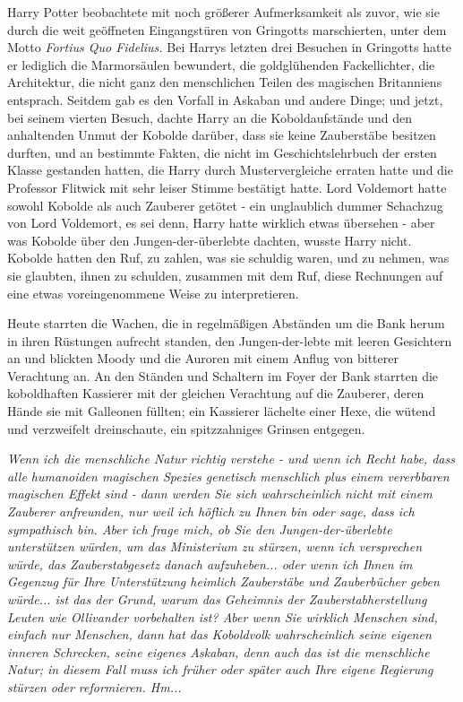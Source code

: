 Harry Potter beobachtete mit noch größerer Aufmerksamkeit als zuvor, wie sie
durch die weit geöffneten Eingangstüren von Gringotts marschierten, unter dem
Motto \emph{Fortius Quo Fidelius.} Bei Harrys letzten drei Besuchen in Gringotts
hatte er lediglich die Marmorsäulen bewundert, die goldglühenden Fackellichter,
die Architektur, die nicht ganz den menschlichen Teilen des magischen
Britanniens entsprach. Seitdem gab es den Vorfall in Askaban und andere Dinge;
und jetzt, bei seinem vierten Besuch, dachte Harry an die Koboldaufstände und
den anhaltenden Unmut der Kobolde darüber, dass sie keine Zauberstäbe besitzen
durften, und an bestimmte Fakten, die nicht im Geschichtslehrbuch der ersten
Klasse gestanden hatten, die Harry durch Mustervergleiche erraten hatte und die
Professor Flitwick mit sehr leiser Stimme bestätigt hatte. Lord Voldemort hatte
sowohl Kobolde als auch Zauberer getötet - ein unglaublich dummer Schachzug von
Lord Voldemort, es sei denn, Harry hatte wirklich etwas übersehen - aber was
Kobolde über den Jungen-der-überlebte dachten, wusste Harry nicht. Kobolde
hatten den Ruf, zu zahlen, was sie schuldig waren, und zu nehmen, was sie
glaubten, ihnen zu schulden, zusammen mit dem Ruf, diese Rechnungen auf eine
etwas voreingenommene Weise zu interpretieren.

Heute starrten die Wachen, die in regelmäßigen Abständen um die Bank herum in
ihren Rüstungen aufrecht standen, den Jungen-der-lebte mit leeren Gesichtern an
und blickten Moody und die Auroren mit einem Anflug von bitterer Verachtung an.
An den Ständen und Schaltern im Foyer der Bank starrten die koboldhaften
Kassierer mit der gleichen Verachtung auf die Zauberer, deren Hände sie mit
Galleonen füllten; ein Kassierer lächelte einer Hexe, die wütend und verzweifelt
dreinschaute, ein spitzzahniges Grinsen entgegen.

\emph{Wenn ich die menschliche Natur richtig verstehe - und wenn ich Recht habe, dass alle humanoiden magischen Spezies genetisch menschlich plus einem vererbbaren magischen Effekt sind - dann werden Sie sich wahrscheinlich nicht mit einem Zauberer anfreunden, nur weil ich höflich zu Ihnen bin oder sage, dass ich sympathisch bin. Aber ich frage mich, ob Sie den Jungen-der-überlebte unterstützen würden, um das Ministerium zu stürzen, wenn ich versprechen würde, das Zauberstabgesetz danach aufzuheben... oder wenn ich Ihnen im Gegenzug für Ihre Unterstützung heimlich Zauberstäbe und Zauberbücher geben würde... ist das der Grund, warum das Geheimnis der Zauberstabherstellung Leuten wie Ollivander vorbehalten ist? Aber wenn Sie wirklich Menschen sind, einfach nur Menschen, dann hat das Koboldvolk wahrscheinlich seine eigenen inneren Schrecken, seine eigenes Askaban, denn auch das ist die menschliche Natur; in diesem Fall muss ich früher oder später auch Ihre eigene Regierung stürzen oder reformieren. Hm... }

